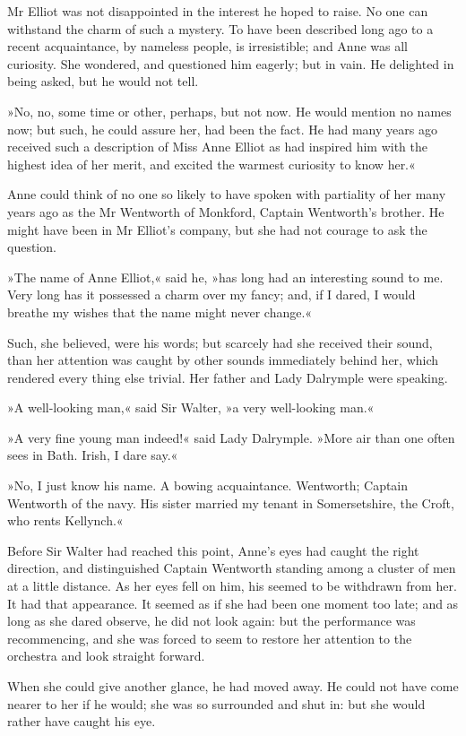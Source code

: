 Mr Elliot was not disappointed in the interest he hoped to raise. No one can withstand the charm of such a mystery. To have been described long ago to a recent acquaintance, by nameless people, is irresistible; and Anne was all curiosity. She wondered, and questioned him eagerly; but in vain. He delighted in being asked, but he would not tell.

»No, no, some time or other, perhaps, but not now. He would mention no names now; but such, he could assure her, had been the fact. He had many years ago received such a description of Miss Anne Elliot as had inspired him with the highest idea of her merit, and excited the warmest curiosity to know her.«

Anne could think of no one so likely to have spoken with partiality of her many years ago as the Mr Wentworth of Monkford, Captain Wentworth's brother. He might have been in Mr Elliot's company, but she had not courage to ask the question.

»The name of Anne Elliot,« said he, »has long had an interesting sound to me. Very long has it possessed a charm over my fancy; and, if I dared, I would breathe my wishes that the name might never change.«

Such, she believed, were his words; but scarcely had she received their sound, than her attention was caught by other sounds immediately behind her, which rendered every thing else trivial. Her father and Lady Dalrymple were speaking.

»A well-looking man,« said Sir Walter, »a very well-looking man.«

»A very fine young man indeed!« said Lady Dalrymple. »More air than one often sees in Bath. Irish, I dare say.«

»No, I just know his name. A bowing acquaintance. Wentworth; Captain Wentworth of the navy. His sister married my tenant in Somersetshire, the Croft, who rents Kellynch.«

Before Sir Walter had reached this point, Anne's eyes had caught the right direction, and distinguished Captain Wentworth standing among a cluster of men at a little distance. As her eyes fell on him, his seemed to be withdrawn from her. It had that appearance. It seemed as if she had been one moment too late; and as long as she dared observe, he did not look again: but the performance was recommencing, and she was forced to seem to restore her attention to the orchestra and look straight forward.

When she could give another glance, he had moved away. He could not have come nearer to her if he would; she was so surrounded and shut in: but she would rather have caught his eye.

